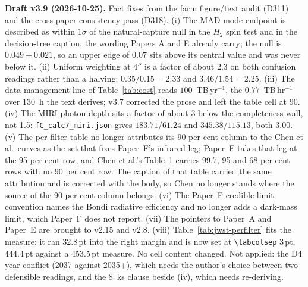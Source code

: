 \documentclass[11pt]{article}
\begin{document}
\textbf{Draft v3.9 (2026-10-25).} Fact fixes from the farm figure/text audit (D311) and the cross-paper consistency pass (D318). (i) The MAD-mode endpoint is described as within $1\sigma$ of the natural-capture null in the $H_2$ spin test and in the decision-tree caption, the wording Papers A and E already carry; the null is $0.049\pm0.021$, so an upper edge of $0.07$ sits above its central value and was never below it. (ii) Uniform weighting at $4''$ is a factor of about 2.3 on both confusion readings rather than a halving: $0.35/0.15 = 2.33$ and $3.46/1.54 = 2.25$. (iii) The data-management line of Table~\ref{tab:cost} reads $100$~TB\,yr$^{-1}$, the $0.77$~TB\,hr$^{-1}$ over $130$~h the text derives; v3.7 corrected the prose and left the table cell at 90. (iv) The MIRI photon depth sits a factor of about 3 below the completeness wall, not 1.5: \texttt{fC\_calc7\_miri.json} gives $183.71/61.24$ and $345.38/115.13$, both 3.00. (v) The per-filter table no longer attributes its 90 per cent column to the Chen et al.\ curves as the set that fixes Paper~F's infrared leg; Paper~F takes that leg at the 95 per cent row, and Chen et al.'s Table~1 carries 99.7, 95 and 68 per cent rows with no 90 per cent row. The caption of that table carried the same attribution and is corrected with the body, so Chen no longer stands where the source of the 90 per cent column belongs. (vi) The Paper~F credible-limit convention names the Bondi radiative efficiency and no longer adds a dark-mass limit, which Paper~F does not report. (vii) The pointers to Paper~A and Paper~E are brought to v2.15 and v2.8. (viii) Table~\ref{tab:jwst-perfilter} fits the measure: it ran 32.8\,pt into the right margin and is now set at \texttt{\textbackslash tabcolsep} 3\,pt, 444.4\,pt against a 453.5\,pt measure. No cell content changed. Not applied: the D4 year conflict (2037 against 2035+), which needs the author's choice between two defensible readings, and the 8~ks clause beside (iv), which needs re-deriving.
\end{document}
